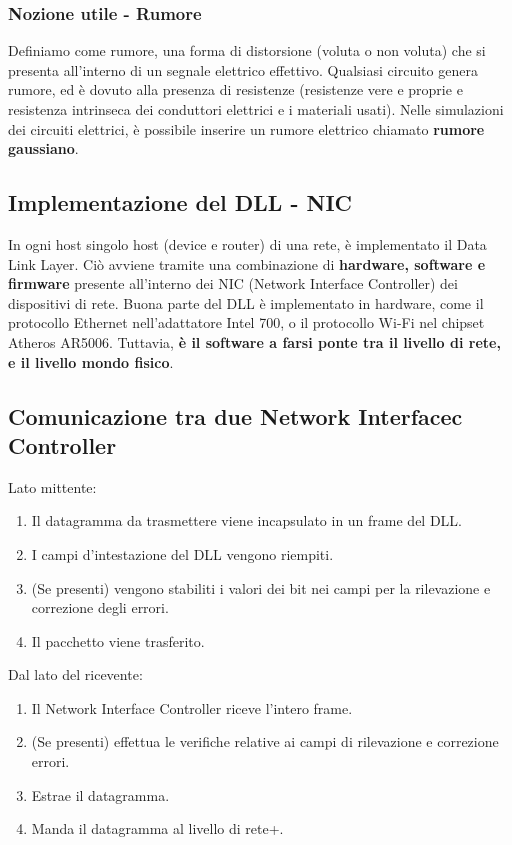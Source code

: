 \subsubsection{Nozione utile - Rumore}
Definiamo come rumore, una forma di distorsione (voluta o non voluta) che si presenta all'interno di un segnale elettrico effettivo. Qualsiasi circuito genera rumore, ed è dovuto alla presenza di resistenze (resistenze vere e proprie e resistenza intrinseca dei conduttori elettrici e i materiali usati). Nelle simulazioni dei circuiti elettrici, è possibile inserire un rumore elettrico chiamato \textbf{rumore gaussiano}.

\subsection{Implementazione del DLL - NIC}
In ogni host singolo host (device e router) di una rete, è implementato il Data Link Layer. Ciò avviene tramite una combinazione di \textbf{hardware, software e firmware} presente all'interno dei NIC (Network Interface Controller) dei dispositivi di rete. Buona parte del DLL è implementato in hardware, come il protocollo Ethernet nell'adattatore Intel 700, o il protocollo Wi-Fi nel chipset Atheros AR5006. Tuttavia, \textbf{è il software a farsi ponte tra il livello di rete, e il livello mondo fisico}.

\subsection{Comunicazione tra due Network Interfacec Controller}
Lato mittente:
\begin{enumerate}
	\item Il datagramma da trasmettere viene incapsulato in un frame del DLL.
	\item I campi d'intestazione del DLL vengono riempiti.
	\item (Se presenti) vengono stabiliti i valori dei bit nei campi per la rilevazione e correzione degli errori.
	\item Il pacchetto viene trasferito.
\end{enumerate}
Dal lato del ricevente:
\begin{enumerate}
	\item Il Network Interface Controller riceve l'intero frame.
	\item (Se presenti) effettua le verifiche relative ai campi di rilevazione e correzione errori.
	\item Estrae il datagramma.
	\item Manda il datagramma al livello di rete+.
\end{enumerate}


